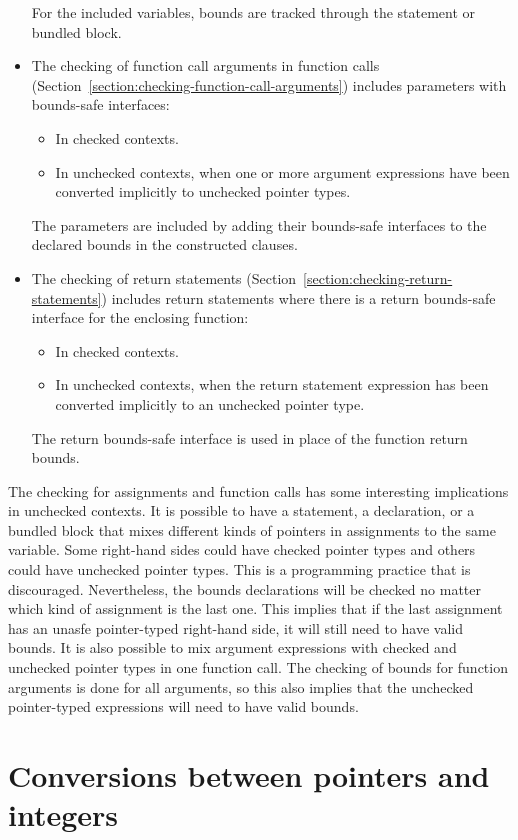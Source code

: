\begin{itemize}
For the included variables, bounds are tracked through the statement or
bundled block.
\item The checking of function call arguments
      in function calls (Section~\ref{section:checking-function-call-arguments})
      includes parameters with bounds-safe interfaces:
\begin{itemize}
\item In checked contexts.
\item In unchecked contexts, when one or more argument expressions have been
      converted implicitly to unchecked pointer types.
\end{itemize}
The parameters are included by adding their bounds-safe interfaces to the
declared bounds in the constructed  clauses.
\item The checking of return statements (Section~\ref{section:checking-return-statements})
includes return statements where there is a return bounds-safe interface for the enclosing function:
\begin{itemize}
\item In checked contexts.
\item In unchecked contexts, when the return statement expression has been converted
      implicitly to an unchecked pointer type.
\end{itemize}
The return bounds-safe interface is used in place of the function return bounds.
\end{itemize}

The checking for assignments and function calls has some interesting 
implications in unchecked contexts.  It is possible to have a statement, 
a declaration, or a bundled block that mixes different kinds of pointers
in assignments to the same  variable.  
Some right-hand sides could have checked pointer types and others
could have unchecked pointer types.  This is a programming practice that is discouraged.
Nevertheless, the bounds declarations will be checked no matter which
kind of assignment is the last one.  This implies that if the last 
assignment has an unasfe pointer-typed right-hand side, it will still need
to have valid bounds.   It is also possible to mix argument expressions with 
checked and unchecked  pointer types in one function call.  The checking of bounds
for function arguments is done for all arguments, so this also implies that the unchecked
pointer-typed expressions will need to have valid bounds.


\section{Conversions between pointers and integers}
\label{section:pointer-integer-conversions}

